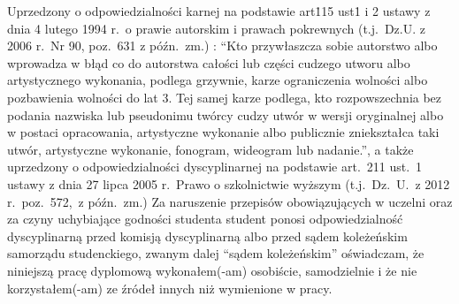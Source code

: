 \begin{titlepage}
\noindent
Uprzedzony o odpowiedzialności karnej na podstawie art\. 115 ust\. 1 i 2 ustawy
z dnia 4 lutego 1994 r.\ o prawie autorskim i prawach pokrewnych (t.j.\ Dz.U. z
2006 r.\ Nr 90, poz.\ 631 z późn.\ zm.) : ``Kto przywłaszcza sobie autorstwo
albo wprowadza w błąd co do autorstwa całości lub części cudzego utworu albo
artystycznego wykonania, podlega grzywnie, karze ograniczenia wolności albo
pozbawienia wolności do lat 3. Tej samej karze podlega, kto rozpowszechnia bez
podania nazwiska lub pseudonimu twórcy cudzy utwór w wersji oryginalnej albo w
postaci opracowania, artystyczne wykonanie albo publicznie zniekształca taki
utwór, artystyczne wykonanie, fonogram, wideogram lub nadanie.'', a także
uprzedzony o odpowiedzialności dyscyplinarnej na podstawie art.\ 211 ust.\ 1
ustawy z dnia  27 lipca 2005 r.\ Prawo o szkolnictwie wyższym (t.j.\ Dz.\ U.\ z
2012 r.\ poz.\ 572,\ z późn.\ zm.) Za naruszenie przepisów obowiązujących w
uczelni oraz za czyny uchybiające godności studenta student ponosi
odpowiedzialność dyscyplinarną przed komisją dyscyplinarną albo przed sądem
koleżeńskim samorządu studenckiego, zwanym dalej ``sądem koleżeńskim''
oświadczam, że niniejszą pracę dyplomową wykonałem(-am) osobiście, samodzielnie
i że nie korzystałem(-am) ze źródeł innych niż wymienione w pracy.

\hspace{6cm}
\makebox[6cm][s]{\dotfill}\par
\hspace{6cm}
\end{titlepage}
